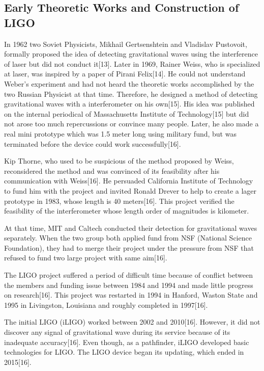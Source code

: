 \documentclass[journal,comsoc,twoside]{IEEEtran}
\begin{document}
\subsection{Early Theoretic Works and Construction of LIGO}
In 1962 two Soviet Physicists, Mikhail Gertsenshtein and Vladislav Pustovoit, formally proposed the idea of detecting gravitational waves using the interference of laser but did not conduct it[13]. Later in 1969, Rainer Weiss, who is specialized at laser, was inspired by a paper of Pirani Felix[14]. He could not understand Weber's experiment and had not heard the theoretic works accomplished by the two Russian Physicist at that time. Therefore, he designed a method of detecting gravitational waves with a interferometer on his own[15]. His idea was published on the internal periodical of Massachusetts Institute of Technology[15] but did not arose too much repercussions or convince many people. Later, he also made a real mini prototype which was 1.5 meter long using military fund, but was terminated before the device could work successfully[16].

Kip Thorne, who used to be suspicious of the method proposed by Weiss, reconsidered the method and was convinced of its feasibility after his communication with Weiss[16]. He persuaded California Institute of Technology to fund him with the project and invited Ronald Drever to help to create a lager prototype in 1983, whose length is 40 meters[16]. This project verified the feasibility of the interferometer whose length order of magnitudes is kilometer.

At that time, MIT and Caltech conducted their detection for gravitational waves separately. When the two group both applied fund from NSF (National Science Foundation), they had to merge their project under the pressure from NSF that refused to fund two large project with same aim[16].

The LIGO project suffered a period of difficult time because of conflict between the members and funding issue between 1984 and 1994 and made little progress on research[16]. This project was restarted in 1994 in Hanford, Waston State and 1995 in Livingston, Louisiana and roughly completed in 1997[16].

The initial LIGO (iLIGO) worked between 2002 and 2010[16]. However, it did not discover any signal of gravitational wave during its service because of its inadequate accuracy[16]. Even though, as a pathfinder, iLIGO developed basic technologies for LIGO. The LIGO device began its updating, which ended in 2015[16].
\end{document}
